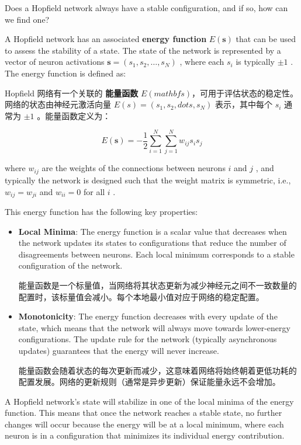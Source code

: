 \documentclass{article}
\begin{document}
Does a Hopfield network always have a stable configuration, and if so, how can we find one?

A Hopfield network has an associated \textbf{energy function} \( E(\mathbf{s}) \) that can be used to assess the stability of a state. The state of the network is represented by a vector of neuron activations $\mathbf{s} = (s_1, s_2, \dots, s_N)$ , where each $s_i$ is typically $\pm 1$ . The energy function is defined as:

Hopfield 网络有一个关联的 \textbf{能量函数} $E(mathbf{s})$，可用于评估状态的稳定性。网络的状态由神经元激活向量 $E(s) = (s_1, s_2, dots, s_N)$ 表示，其中每个 $s_i$ 通常为 $\pm 1$ 。能量函数定义为：

$$E(\mathbf{s}) = -\frac{1}{2} \sum_{i=1}^N \sum_{j=1}^N w_{ij} s_i s_j$$

where $w_{ij}$ are the weights of the connections between neurons $i$ and $j$ , and typically the network is designed such that the weight matrix is symmetric, i.e., $w_{ij} = w_{ji}$ and $w_{ii} = 0$ for all $i$ .

This energy function has the following key properties:
\begin{itemize}
    \item \textbf{Local Minima}: The energy function is a scalar value that decreases when the network updates its states to configurations that reduce the number of disagreements between neurons. Each local minimum corresponds to a stable configuration of the network.
    
    能量函数是一个标量值，当网络将其状态更新为减少神经元之间不一致数量的配置时，该标量值会减小。每个本地最小值对应于网络的稳定配置。
    \item \textbf{Monotonicity}: The energy function decreases with every update of the state, which means that the network will always move towards lower-energy configurations. The update rule for the network (typically asynchronous updates) guarantees that the energy will never increase.
    
    能量函数会随着状态的每次更新而减少，这意味着网络将始终朝着更低功耗的配置发展。网络的更新规则（通常是异步更新）保证能量永远不会增加。
\end{itemize}

A Hopfield network's state will stabilize in one of the local minima of the energy function. This means that once the network reaches a stable state, no further changes will occur because the energy will be at a local minimum, where each neuron is in a configuration that minimizes its individual energy contribution.
\end{document}
